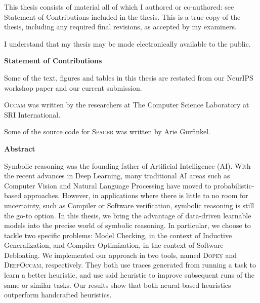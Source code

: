 

  \noindent
This  thesis  consists  of  material  all  of  which  I  authored  or  co-authored: see  Statement of Contributions included in the thesis.  This is a true copy of the thesis,  including any required final revisions, as accepted by my examiners. 



  \bigskip
  
  \noindent
I understand that my thesis may be made electronically available to the public.

\cleardoublepage
\begin{center}
\textbf{Statement of Contributions}
\end{center}
Some of the text, figures and tables in this thesis are restated from our NeurIPS workshop paper \cite{Nham:nips19} and our current submission.

\textsc{Occam} was written by the researchers at The Computer Science Laboratory at SRI International.

Some of the source code for \textsc{Spacer} was written by Arie Gurfinkel.
\cleardoublepage

\begin{center}\textbf{Abstract}\end{center}
Symbolic reasoning was the founding father of Artificial Intelligence (AI). With the recent advances in Deep Learning, many traditional AI areas such as Computer Vision and Natural Language Processing have moved to probabilistic-based approaches. However, in applications where there is little to no room for uncertainty, such as Compiler or Software verification, symbolic reasoning is still the go-to option. In this thesis, we bring the advantage of data-driven learnable models into the precise world of symbolic reasoning. In particular, we choose to tackle two specific problems: Model Checking, in the context of Inductive Generalization, and Compiler Optimization, in the context of Software Debloating. We implemented our approach in two tools, named \textsc{Dopey} and \textsc{DeepOccam}, respectively. They both use traces generated from running a task to learn a better heuristic, and use said heuristic to improve subsequent runs of the same or similar tasks. Our results show that both neural-based heuristics outperform handcrafted heuristics.

